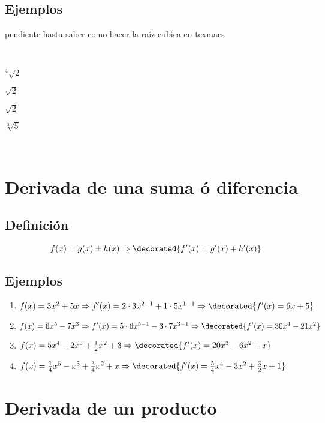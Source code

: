\documentclass{article}
\begin{document}
\subsection{Ejemplos}

pendiente hasta saber como hacer la ra{\'i}z cubica en texmacs

\

$^4 \sqrt{2}$



$\sqrt{2}$

$\sqrt{2}$

$\sqrt[2]{5}$

\

{\newpage}

\section{Derivada de una suma {\'o} diferencia}

\subsection{Definici{\'o}n}

\[ f (x) = g (x) \pm h (x) \Rightarrow \decorated{f' (x) = g' (x) + h' (x)} \]

\subsection{Ejemplos}

\begin{enumerate}
  \item $f (x) = 3 x^2 + 5 x \Rightarrow f' (x) = 2 \cdot 3 x^{2 - 1} + 1
  \cdot 5 x^{1 - 1} \Rightarrow \decorated{f' (x) = 6 x + 5}$
  
  \item $f (x) = 6 x^5 - 7 x^3 \Rightarrow f' (x) = 5 \cdot 6 x^{5 - 1} - 3
  \cdot 7 x^{3 - 1} \Rightarrow \decorated{f' (x) = 30 x^4 - 21 x^2}$
  
  \item $f (x) = 5 x^4 - 2 x^3 + \frac{1}{2} x^2 + 3 \Rightarrow \decorated{f'
  (x) = 20 x^3 - 6 x^2 + x}$
  
  \item $f (x) = \frac{1}{4} x^5 - x^3 + \frac{3}{4} x^2 + x \Rightarrow
  \decorated{f' (x) = \frac{5}{4} x^4 - 3 x^2 + \frac{3}{2} x + 1}$
\end{enumerate}


\section{Derivada de un producto}
\end{document}
